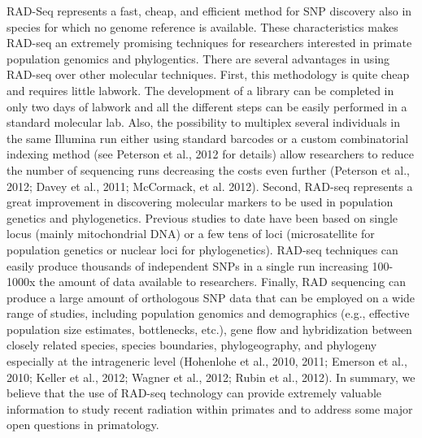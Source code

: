 \documentclass[12pt]{article}
\begin{document}
RAD-Seq represents a fast, cheap, and efficient method for SNP discovery also in species for which no genome reference is available. These characteristics makes RAD-seq an extremely promising techniques for researchers interested in primate population genomics and phylogentics. There are several advantages in using RAD-seq over other molecular techniques. First, this methodology is quite cheap and requires little labwork. The development of a library can be completed in only two days of labwork and all the different steps can be easily performed in a standard molecular lab. Also, the possibility to multiplex several individuals in the same Illumina run either using standard barcodes or a custom combinatorial indexing method (see Peterson et al., 2012 for details) allow researchers to reduce the number of sequencing runs decreasing the costs even further (Peterson et al., 2012; Davey et al., 2011; McCormack, et al. 2012). Second, RAD-seq represents a great improvement in discovering molecular markers to be used in population genetics and phylogenetics. Previous studies to date have been based on single locus (mainly mitochondrial DNA) or a few tens of loci (microsatellite for population genetics or nuclear loci for phylogenetics). RAD-seq techniques can easily produce thousands of independent SNPs in a single run increasing 100-1000x the amount of data available to researchers. Finally, RAD sequencing can produce a large amount of orthologous SNP data that can be employed on a wide range of studies, including population genomics and demographics (e.g., effective population size estimates, bottlenecks, etc.), gene flow and hybridization between closely related species, species boundaries, phylogeography, and phylogeny especially at the intrageneric level (Hohenlohe et al., 2010, 2011; Emerson et al., 2010; Keller et al., 2012; Wagner et al., 2012; Rubin et al., 2012). In summary, we believe that the use of RAD-seq technology can provide extremely valuable information to study recent radiation within primates and to address some major open questions in primatology.
\end{document}
